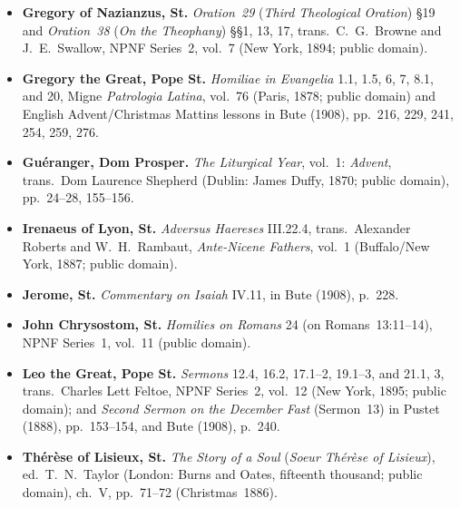 \begin{itemize}
\item \textbf{Gregory of Nazianzus, St.} \textit{Oration~29} (\textit{Third Theological Oration}) \S19 and \textit{Oration~38} (\textit{On the Theophany}) \S\S1, 13, 17, trans.~C.~G.~Browne and J.~E.~Swallow, NPNF Series~2, vol.~7 (New York, 1894; public domain).
\item \textbf{Gregory the Great, Pope St.} \textit{Homiliae in Evangelia} 1.1, 1.5, 6, 7, 8.1, and 20, Migne \textit{Patrologia Latina}, vol.~76 (Paris, 1878; public domain) and English Advent/Christmas Mattins lessons in Bute (1908), pp.~216, 229, 241, 254, 259, 276.
\item \textbf{Gu\'eranger, Dom Prosper.} \textit{The Liturgical Year}, vol.~1: \textit{Advent}, trans.~Dom Laurence Shepherd (Dublin: James Duffy, 1870; public domain), pp.~24--28, 155--156.
\item \textbf{Irenaeus of Lyon, St.} \textit{Adversus Haereses} III.22.4, trans.~Alexander Roberts and W.~H.~Rambaut, \textit{Ante-Nicene Fathers}, vol.~1 (Buffalo/New York, 1887; public domain).
\item \textbf{Jerome, St.} \textit{Commentary on Isaiah} IV.11, in Bute (1908), p.~228.
\item \textbf{John Chrysostom, St.} \textit{Homilies on Romans} 24 (on Romans~13:11--14), NPNF Series~1, vol.~11 (public domain).
\item \textbf{Leo the Great, Pope St.} \textit{Sermons} 12.4, 16.2, 17.1--2, 19.1--3, and 21.1, 3, trans.~Charles Lett Feltoe, NPNF Series~2, vol.~12 (New York, 1895; public domain); and \textit{Second Sermon on the December Fast} (Sermon~13) in Pustet (1888), pp.~153--154, and Bute (1908), p.~240.
\item \textbf{Th\'er\`ese of Lisieux, St.} \textit{The Story of a Soul} (\textit{Soeur Th\'er\`ese of Lisieux}), ed.~T.~N.~Taylor (London: Burns and Oates, fifteenth thousand; public domain), ch.~V, pp.~71--72 (Christmas~1886).
\end{itemize}
